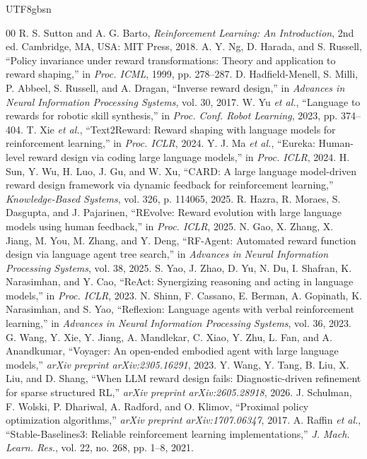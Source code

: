 \documentclass[conference]{IEEEtran}
\begin{document}
\begin{CJK}{UTF8}{gbsn}
\enlargethispage{5\baselineskip}
\fontsize{6.7}{7.1}\selectfont
\begin{thebibliography}{00}
\setlength{\itemsep}{-1.2pt}
\setlength{\parskip}{0pt}
R. S. Sutton and A. G. Barto, \emph{Reinforcement Learning: An Introduction},
2nd ed. Cambridge, MA, USA: MIT Press, 2018.
A. Y. Ng, D. Harada, and S. Russell, ``Policy invariance under reward
transformations: Theory and application to reward shaping,'' in \emph{Proc.
ICML}, 1999, pp. 278--287.
D. Hadfield-Menell, S. Milli, P. Abbeel, S. Russell, and A. Dragan, ``Inverse
reward design,'' in \emph{Advances in Neural Information Processing Systems},
vol. 30, 2017.
W. Yu \emph{et al.}, ``Language to rewards for robotic skill synthesis,'' in
\emph{Proc. Conf. Robot Learning}, 2023, pp. 374--404.
T. Xie \emph{et al.}, ``Text2Reward: Reward shaping with language models for
reinforcement learning,'' in \emph{Proc. ICLR}, 2024.
Y. J. Ma \emph{et al.}, ``Eureka: Human-level reward design via coding large
language models,'' in \emph{Proc. ICLR}, 2024.
H. Sun, Y. Wu, H. Luo, J. Gu, and W. Xu, ``CARD: A large language model-driven
reward design framework via dynamic feedback for reinforcement learning,''
\emph{Knowledge-Based Systems}, vol. 326, p. 114065, 2025.
R. Hazra, R. Moraes, S. Dasgupta, and J. Pajarinen, ``REvolve: Reward evolution
with large language models using human feedback,'' in \emph{Proc. ICLR}, 2025.
N. Gao, X. Zhang, X. Jiang, M. You, M. Zhang, and Y. Deng, ``RF-Agent:
Automated reward function design via language agent tree search,'' in
\emph{Advances in Neural Information Processing Systems}, vol. 38, 2025.
S. Yao, J. Zhao, D. Yu, N. Du, I. Shafran, K. Narasimhan, and Y. Cao,
``ReAct: Synergizing reasoning and acting in language models,'' in
\emph{Proc. ICLR}, 2023.
N. Shinn, F. Cassano, E. Berman, A. Gopinath, K. Narasimhan, and S. Yao,
``Reflexion: Language agents with verbal reinforcement learning,'' in
\emph{Advances in Neural Information Processing Systems}, vol. 36, 2023.
G. Wang, Y. Xie, Y. Jiang, A. Mandlekar, C. Xiao, Y. Zhu, L. Fan, and A.
Anandkumar, ``Voyager: An open-ended embodied agent with large language
models,'' \emph{arXiv preprint arXiv:2305.16291}, 2023.
Y. Wang, Y. Tang, B. Liu, X. Liu, and D. Shang, ``When LLM reward design
fails: Diagnostic-driven refinement for sparse structured RL,'' \emph{arXiv
preprint arXiv:2605.28918}, 2026.
J. Schulman, F. Wolski, P. Dhariwal, A. Radford, and O. Klimov, ``Proximal
policy optimization algorithms,'' \emph{arXiv preprint arXiv:1707.06347}, 2017.
A. Raffin \emph{et al.}, ``Stable-Baselines3: Reliable reinforcement learning
implementations,'' \emph{J. Mach. Learn. Res.}, vol. 22, no. 268, pp. 1--8,
2021.
\end{thebibliography}

\end{CJK}
\end{document}
